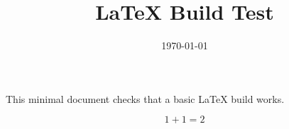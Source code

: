 \documentclass{article}
\title{LaTeX Build Test}
\author{}
\date{\today}
\begin{document}
\maketitle

This minimal document checks that a basic LaTeX build works.

\[
  1 + 1 = 2
  
\]
\end{document}
